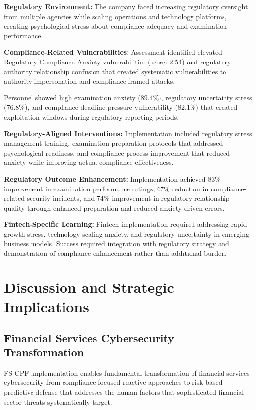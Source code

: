 \documentclass[10pt, twocolumn]{article}
\begin{document}
\textbf{Regulatory Environment:} The company faced increasing regulatory oversight from multiple agencies while scaling operations and technology platforms, creating psychological stress about compliance adequacy and examination performance.

\textbf{Compliance-Related Vulnerabilities:} Assessment identified elevated Regulatory Compliance Anxiety vulnerabilities (score: 2.54) and regulatory authority relationship confusion that created systematic vulnerabilities to authority impersonation and compliance-framed attacks.

Personnel showed high examination anxiety (89.4\%), regulatory uncertainty stress (76.8\%), and compliance deadline pressure vulnerability (82.1\%) that created exploitation windows during regulatory reporting periods.

\textbf{Regulatory-Aligned Interventions:} Implementation included regulatory stress management training, examination preparation protocols that addressed psychological readiness, and compliance process improvement that reduced anxiety while improving actual compliance effectiveness.

\textbf{Regulatory Outcome Enhancement:} Implementation achieved 83\% improvement in examination performance ratings, 67\% reduction in compliance-related security incidents, and 74\% improvement in regulatory relationship quality through enhanced preparation and reduced anxiety-driven errors.

\textbf{Fintech-Specific Learning:} Fintech implementation required addressing rapid growth stress, technology scaling anxiety, and regulatory uncertainty in emerging business models. Success required integration with regulatory strategy and demonstration of compliance enhancement rather than additional burden.

\section{Discussion and Strategic Implications}

\subsection{Financial Services Cybersecurity Transformation}

FS-CPF implementation enables fundamental transformation of financial services cybersecurity from compliance-focused reactive approaches to risk-based predictive defense that addresses the human factors that sophisticated financial sector threats systematically target.
\end{document}
